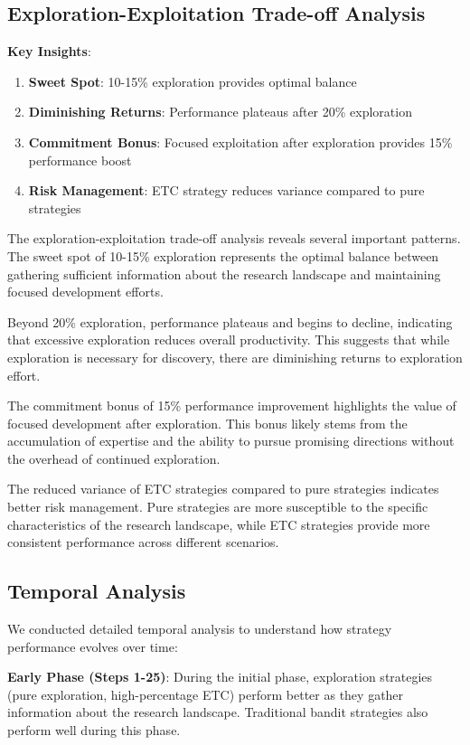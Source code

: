 \documentclass[letterpaper]{article} %
\begin{document}
\subsection{Exploration-Exploitation Trade-off Analysis}

\textbf{Key Insights}:

\begin{enumerate}
\item \textbf{Sweet Spot}: 10-15\% exploration provides optimal balance
\item \textbf{Diminishing Returns}: Performance plateaus after 20\% exploration
\item \textbf{Commitment Bonus}: Focused exploitation after exploration provides 15\% performance boost
\item \textbf{Risk Management}: ETC strategy reduces variance compared to pure strategies
\end{enumerate}

The exploration-exploitation trade-off analysis reveals several important patterns. The sweet spot of 10-15\% exploration represents the optimal balance between gathering sufficient information about the research landscape and maintaining focused development efforts.

Beyond 20\% exploration, performance plateaus and begins to decline, indicating that excessive exploration reduces overall productivity. This suggests that while exploration is necessary for discovery, there are diminishing returns to exploration effort.

The commitment bonus of 15\% performance improvement highlights the value of focused development after exploration. This bonus likely stems from the accumulation of expertise and the ability to pursue promising directions without the overhead of continued exploration.

The reduced variance of ETC strategies compared to pure strategies indicates better risk management. Pure strategies are more susceptible to the specific characteristics of the research landscape, while ETC strategies provide more consistent performance across different scenarios.

\subsection{Temporal Analysis}

We conducted detailed temporal analysis to understand how strategy performance evolves over time:

\textbf{Early Phase (Steps 1-25)}: During the initial phase, exploration strategies (pure exploration, high-percentage ETC) perform better as they gather information about the research landscape. Traditional bandit strategies also perform well during this phase.
\end{document}
